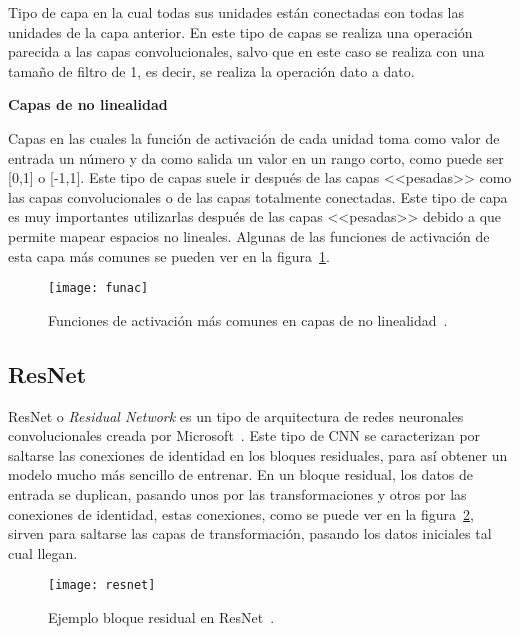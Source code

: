 Tipo de capa en la cual todas sus unidades están conectadas con todas las unidades de la capa anterior. En este tipo de capas se realiza una operación parecida a las capas convolucionales, salvo que en este caso se realiza con una tamaño de filtro de 1, es decir, se realiza la operación dato a dato. 

\textbf{Capas de no linealidad}

Capas en las cuales la función de activación de cada unidad toma como valor de entrada un número y da como salida un valor en un rango corto, como puede ser [0,1] o [-1,1]. Este tipo de capas suele ir después de las capas <<pesadas>> como las capas convolucionales o de las capas totalmente conectadas. Este tipo de capa es muy importantes utilizarlas después de las capas <<pesadas>> debido a que permite mapear espacios no lineales. Algunas de las funciones de activación de esta capa más comunes se pueden ver en la figura~\ref{fig:funac}.

\begin{figure}[h]
	\centering
	\texttt{[image: funac]}
	\caption{Funciones de activación más comunes en capas de no linealidad~\cite{cnn}.}
	\label{fig:funac}
\end{figure}
\subsection{ResNet}
ResNet o \textit{Residual Network} es un tipo de arquitectura de redes neuronales convolucionales creada por Microsoft~\cite{resnet}. Este tipo de CNN se caracterizan por saltarse las conexiones de identidad en los bloques residuales, para así obtener un modelo mucho más sencillo de entrenar. En un bloque residual, los datos de entrada se duplican, pasando unos por las transformaciones y otros por las conexiones de identidad, estas conexiones, como se puede ver en la figura~\ref{fig:resnet}, sirven para saltarse las capas de transformación, pasando los datos iniciales tal cual llegan.

\begin{figure}[h]
	\centering
	\texttt{[image: resnet]}
	\caption{Ejemplo bloque residual en ResNet~\cite{cnn}.}
	\label{fig:resnet}
\end{figure}
